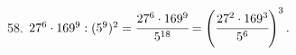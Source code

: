 58. $27^6\cdot169^9:(5^9)^2=\cfrac{27^6\cdot169^9}{5^{18}}=\left(\cfrac{27^2\cdot169^3}{5^6}\right)^3.$\\
